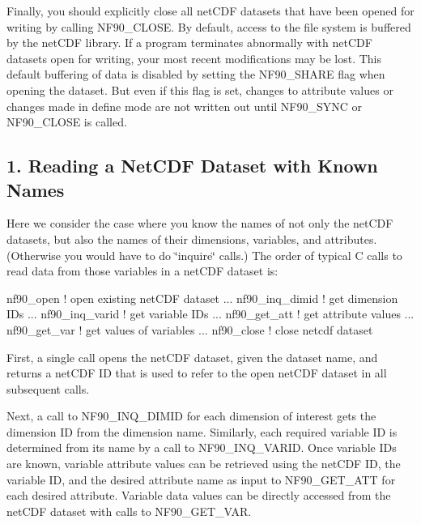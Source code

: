 Finally, you should explicitly close all net\+C\+DF datasets that have been opened for writing by calling N\+F90\+\_\+\+C\+L\+O\+SE. By default, access to the file system is buffered by the net\+C\+DF library. If a program terminates abnormally with net\+C\+DF datasets open for writing, your most recent modifications may be lost. This default buffering of data is disabled by setting the N\+F90\+\_\+\+S\+H\+A\+RE flag when opening the dataset. But even if this flag is set, changes to attribute values or changes made in define mode are not written out until N\+F90\+\_\+\+S\+Y\+NC or N\+F90\+\_\+\+C\+L\+O\+SE is called.\hypertarget{f90-use-of-the-netcdf-library_f90-reading-a-netcdf-dataset-with-known-names}{}\subsection{1. Reading a Net\+C\+D\+F Dataset with Known Names }\label{f90-use-of-the-netcdf-library_f90-reading-a-netcdf-dataset-with-known-names}
Here we consider the case where you know the names of not only the net\+C\+DF datasets, but also the names of their dimensions, variables, and attributes. (Otherwise you would have to do \char`\"{}inquire\char`\"{} calls.) The order of typical C calls to read data from those variables in a net\+C\+DF dataset is\+:


\begin{DoxyCode}
nf90\_open               \textcolor{comment}{! open existing netCDF dataset}
     ...
   nf90\_inq\_dimid       \textcolor{comment}{! get dimension IDs}
     ...
   nf90\_inq\_varid       \textcolor{comment}{! get variable IDs}
     ...
   nf90\_get\_att         \textcolor{comment}{! get attribute values}
     ...
   nf90\_get\_var         \textcolor{comment}{! get values of variables}
     ...
nf90\_close              ! \textcolor{keyword}{close} netcdf dataset
\end{DoxyCode}


First, a single call opens the net\+C\+DF dataset, given the dataset name, and returns a net\+C\+DF ID that is used to refer to the open net\+C\+DF dataset in all subsequent calls.

Next, a call to N\+F90\+\_\+\+I\+N\+Q\+\_\+\+D\+I\+M\+ID for each dimension of interest gets the dimension ID from the dimension name. Similarly, each required variable ID is determined from its name by a call to N\+F90\+\_\+\+I\+N\+Q\+\_\+\+V\+A\+R\+ID. Once variable I\+Ds are known, variable attribute values can be retrieved using the net\+C\+DF ID, the variable ID, and the desired attribute name as input to N\+F90\+\_\+\+G\+E\+T\+\_\+\+A\+TT for each desired attribute. Variable data values can be directly accessed from the net\+C\+DF dataset with calls to N\+F90\+\_\+\+G\+E\+T\+\_\+\+V\+AR.

